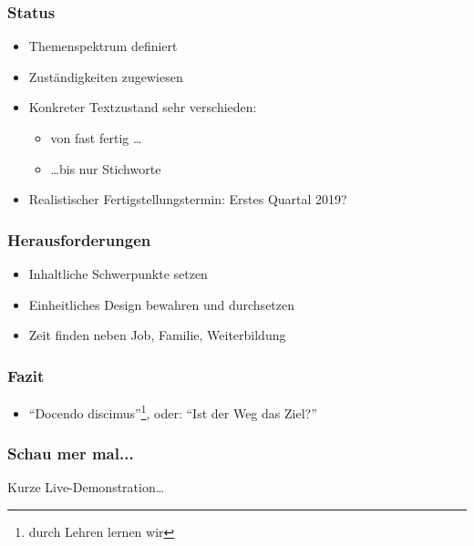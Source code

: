 \documentclass[12pt,ngerman]{beamer}
\begin{document}
\begin{frame}
\frametitle{Status}

\begin{itemize}
\item Themenspektrum definiert
\item Zuständigkeiten zugewiesen
\item Konkreter Textzustand sehr verschieden:
  \begin{itemize}
  \item von fast fertig \ldots
  \item \ldots bis nur Stichworte
  \end{itemize}
\item Realistischer Fertigstellungstermin: Erstes Quartal 2019?
\end{itemize}
\end{frame}


\begin{frame}
\frametitle{Herausforderungen}

\begin{itemize}
\item Inhaltliche Schwerpunkte setzen
\item Einheitliches Design bewahren und durchsetzen
\item Zeit finden neben Job, Familie, Weiterbildung
\end{itemize}
\end{frame}


\begin{frame}
\frametitle{Fazit}

\begin{itemize}
\item \enquote{Docendo discimus}\footnote{durch Lehren lernen wir}, oder: \enquote{Ist der Weg das Ziel?}
\end{itemize}
\end{frame}


\begin{frame}
\frametitle{Schau mer mal...}

Kurze Live-Demonstration\ldots
\end{frame}
\end{document}

